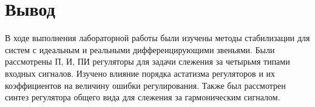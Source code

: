 \chapter{Вывод}
В ходе выполнения лабораторной работы были изучены методы стабилизации
для систем с идеальным и реальными дифференцирующими звеньями. Были
рассмотрены П, И, ПИ регуляторы для задачи слежения за четырьмя типами
входных сигналов. Изучено влияние порядка астатизма регуляторов и их
коэффициентов на величину ошибки регулирования.
Также был рассмотрен синтез регулятора общего вида 
для слежения за гармоническим сигналом. 
\endinput